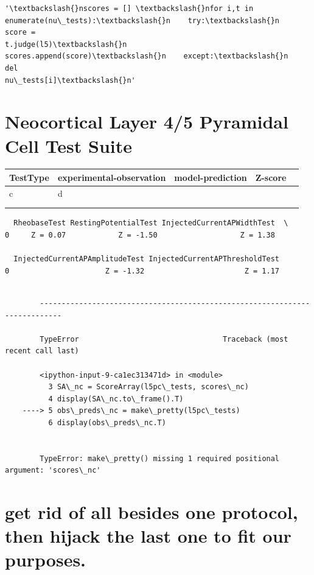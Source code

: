             \begin{tcolorbox}[breakable, size=fbox, boxrule=.5pt, pad at break*=1mm, opacityfill=0]
\begin{Verbatim}[commandchars=\\\{\}]
'\textbackslash{}nscores = [] \textbackslash{}nfor i,t in enumerate(nu\_tests):\textbackslash{}n    try:\textbackslash{}n        score =
t.judge(l5)\textbackslash{}n        scores.append(score)\textbackslash{}n    except:\textbackslash{}n        del
nu\_tests[i]\textbackslash{}n'
\end{Verbatim}
\end{tcolorbox}
        
    \hypertarget{neocortical-layer-45-pyramidal-cell-test-suite}{%
\section{Neocortical Layer 4/5 Pyramidal Cell Test
Suite}\label{neocortical-layer-45-pyramidal-cell-test-suite}}

\begin{table}[]
\begin{tabular}{|l|l|l|l|l|}
\hline
TestType & experimental-observation & model-prediction& Z-score &  \\ \hline
c & d &  &  &  \\ \hline
  &   &  &  &  \\ \hline
  &   &  &  &  \\ \hline
\end{tabular}
\end{table}    
    
    \begin{verbatim}
  RheobaseTest RestingPotentialTest InjectedCurrentAPWidthTest  \
0     Z = 0.07            Z = -1.50                   Z = 1.38   

  InjectedCurrentAPAmplitudeTest InjectedCurrentAPThresholdTest  
0                      Z = -1.32                       Z = 1.17  
    \end{verbatim}

    
    \begin{Verbatim}[commandchars=\\\{\}]

        ---------------------------------------------------------------------------

        TypeError                                 Traceback (most recent call last)

        <ipython-input-9-ca1ec313471d> in <module>
          3 SA\_nc = ScoreArray(l5pc\_tests, scores\_nc)
          4 display(SA\_nc.to\_frame().T)
    ----> 5 obs\_preds\_nc = make\_pretty(l5pc\_tests)
          6 display(obs\_preds\_nc.T)


        TypeError: make\_pretty() missing 1 required positional argument: 'scores\_nc'

    \end{Verbatim}

    \hypertarget{get-rid-of-all-besides-one-protocol-then-hijack-the-last-one-to-fit-our-purposes.}{%
\section{get rid of all besides one protocol, then hijack the last one
to fit our
purposes.}\label{get-rid-of-all-besides-one-protocol-then-hijack-the-last-one-to-fit-our-purposes.}}


